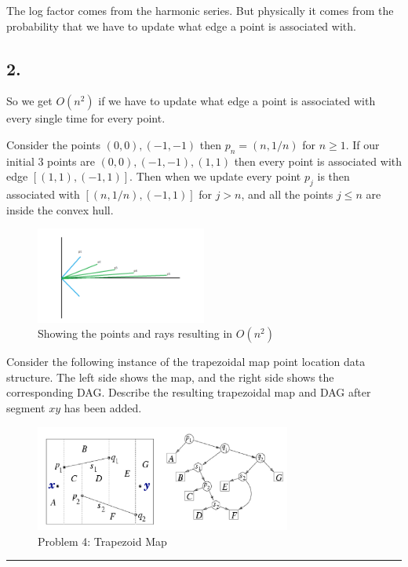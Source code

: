 \documentclass[11pt]{article}
\begin{document}
The log factor comes from the harmonic series. But physically it comes from the probability that we have to update what edge a point is associated with.

\subsection*{2. }

So we get $O(n^2)$ if we have to update what edge a point is associated with every single time
for every point. 

Consider the points $(0,0), (-1, -1)$ then $p_n = (n, 1/n)$ for $n \geq 1$.
If our initial 3 points are $(0,0),(-1,-1),(1,1)$ then every point is associated with
edge $[(1,1), (-1,1)]$. Then when we update every point $p_j$ is then associated with $[(n,1/n), (-1,1)]$
for $j > n$, and all the points $j \leq n$ are inside the convex hull. 


\begin{figure}[h]
    \centering
    \includegraphics[width=0.5\textwidth]{bad}
    \caption{Showing the points and rays resulting in $O(n^2)$}
\end{figure}














Consider the following instance of the trapezoidal map point location data
structure. The left side shows the map, and the right side shows the
corresponding DAG. Describe the resulting trapezoidal map and DAG after segment
$xy$ has been added.

\begin{figure}[h]
    \centering
    \includegraphics[width=0.75\textwidth]{trapMap}
    \caption{Problem 4: Trapezoid Map}
\end{figure}
\hrule
\end{document}
